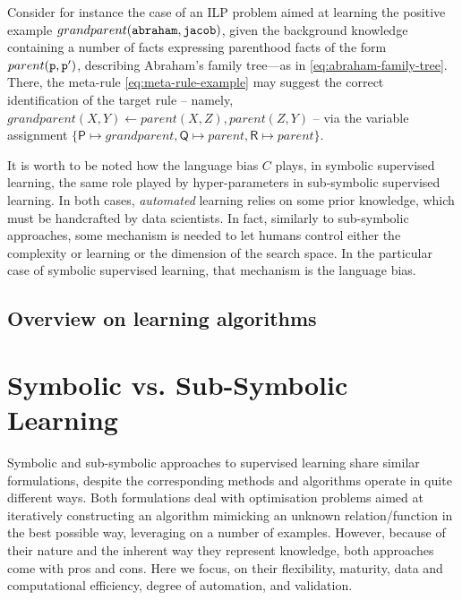 \documentclass[12pt,a4paper,openright,twoside]{book}
\begin{document}
Consider for instance the case of an ILP problem aimed at learning the positive example $grandparent(\mathtt{abraham}, \mathtt{jacob})$, given the background knowledge containing a number of facts expressing parenthood facts of the form $parent(\mathtt{p}, \mathtt{p}')$, describing Abraham's family tree---as in \cref{eq:abraham-family-tree}.
%
There, the meta-rule \ref{eq:meta-rule-example} may suggest the correct identification of the target rule -- namely, $grandparent(X, Y) \leftarrow parent(X, Z), parent(Z, Y)$ -- via the variable assignment $\{ \textsf{P} \mapsto grandparent, \textsf{Q} \mapsto parent, \textsf{R} \mapsto parent \}$.

It is worth to be noted how the language bias $C$ plays, in symbolic supervised learning, the same role played by hyper-parameters in sub-symbolic supervised learning.
%
In both cases, \emph{automated} learning relies on some prior knowledge, which must be handcrafted by data scientists.
%
In fact, similarly to sub-symbolic approaches, some mechanism is needed to let humans control either the complexity or learning or the dimension of the search space.
%
In the particular case of symbolic supervised learning, that mechanism is the language bias.

\subsection{Overview on learning algorithms}


\section{Symbolic vs. Sub-Symbolic Learning}

Symbolic and sub-symbolic approaches to supervised learning share similar formulations, despite the corresponding methods and algorithms operate in quite different ways.
%
Both formulations deal with optimisation problems aimed at iteratively constructing an algorithm mimicking an unknown relation/function in the best possible way, leveraging on a number of examples.
%
However, because of their nature and the inherent way they represent knowledge, both approaches come with pros and cons.
%
Here we focus, on their flexibility, maturity, data and computational efficiency, degree of automation, and validation.
\end{document}
